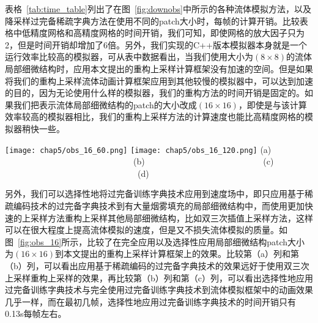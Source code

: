 表格~\ref{tab:time_table}列出了在图~\ref{fig:downobs}中所示的各种流体模拟方法，以及降采样过完备稀疏字典方法在使用不同的patch大小时，每帧的计算开销。比较表格中低精度网格和高精度网格的时间开销，我们可知，即使网格的放大因子只为2，但是时间开销却增加了6倍。另外，我们实现的C++版本模拟器本身就是一个运行效率比较高的模拟器，可从表中数据看出，当我们使用大小为\((8 \times 8)\)的流体局部细微结构时，应用本文提出的重构上采样计算框架没有加速的空间。但是如果将我们的重构上采样流体动画计算框架应用到其他较慢的模拟器中，可以达到加速的目的，因为无论使用什么样的模拟器，我们的重构方法的时间开销是固定的。如果我们把表示流体局部细微结构的patch的大小改成\((16 \times 16)\)，即使是与该计算效率较高的模拟器相比，我们的重构上采样方法的计算速度也能比高精度网格的模拟器稍快一些。

\begin{figure*}
 \center
 \texttt{[image: chap5/obs\_16\_60.png]}
\newline \texttt{[image: chap5/obs\_16\_120.png]}
\newline  (a) \ \ \ \ \ \ \ \ \ \ \ \ \ \ \ \ \ \ \ \ \ \ \ \ \ \ \ \ \ \ (b) \ \ \ \ \ \ \ \ \ \ \ \ \ \ \ \ \ \ \ \ \ \ \ \ \ \ \ (c) \ \ \ \ \ \ \ \ \ \ \ \ \ \ \ \ \ \ \ \ \ \ \ \ \ \ \ \ \ \ \ (d)
\end{figure*}

另外，我们可以选择性地将过完备训练字典技术应用到速度场中，即只应用基于稀疏编码技术的过完备字典技术到有大量烟雾填充的局部细微结构中，而使用更加快速的上采样方法重构上采样其他局部细微结构，比如双三次插值上采样方法，这样可以在很大程度上提高流体模拟的速度，但是又不损失流体模拟的质量。如图~\ref{fig:obs_16}所示，比较了在完全应用以及选择性应用局部细微结构patch大小为\((16 \times 16)\)到本文提出的重构上采样计算框架上的效果。比较第（a）列和第（b）列，可以看出应用基于稀疏编码的过完备字典技术的效果远好于使用双三次上采样重构上采样的效果，再比较第（b）列和第（c）列，可以看出选择性地应用过完备训练字典技术与完全使用过完备训练字典技术到流体模拟框架中的动画效果几乎一样，而在最初几帧，选择性地应用过完备训练字典技术的时间开销只有0.13s每帧左右。

